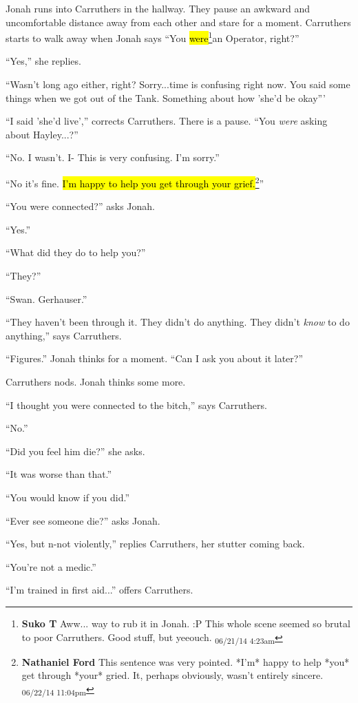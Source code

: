 Jonah runs into Carruthers in the hallway.  They pause an awkward and uncomfortable distance away from each other and stare for a moment.   Carruthers starts to walk away when Jonah says ``You \hl{were}\footnote{\textbf{Suko T }Aww... way to rub it in Jonah. :P  This whole scene seemed so brutal to poor Carruthers.  Good stuff, but yeeouch. \textsubscript{06/21/14 4:23am}}an Operator, right?''

``Yes,'' she replies.

``Wasn't long ago either, right?  Sorry...time is confusing right now.  You said some things when we got out of the Tank.  Something about how 'she'd be okay'''

``I said 'she'd live','' corrects Carruthers.  There is a pause.  ``You \textit{were }asking about Hayley...?''

``No.  I wasn't.  I- This is very confusing.  I'm sorry.''

``No it's fine. \hl{I'm happy to help you get through your grief.}\footnote{\textbf{Nathaniel Ford }This sentence was very pointed. *I'm* happy to help *you* get through *your* gried. It, perhaps obviously, wasn't entirely sincere. \textsubscript{06/22/14 11:04pm}}''

``You were connected?'' asks Jonah.

``Yes.''

``What did they do to help you?''

``They?''

``Swan.  Gerhauser.''

``They haven't been through it.  They didn't do anything.  They didn't \textit{know }to do anything,'' says Carruthers.

``Figures.''  Jonah thinks for a moment.  ``Can I ask you about it later?''

Carruthers nods.   Jonah thinks some more.

``I thought you were connected to the bitch,'' says Carruthers.

``No.''

``Did you feel him die?'' she asks.

``It was worse than that.''

``You would know if you did.''

``Ever see someone die?'' asks Jonah.

``Yes, but n-not violently,'' replies Carruthers, her stutter coming back.

``You're not a medic.''

``I'm trained in first aid...'' offers Carruthers.


